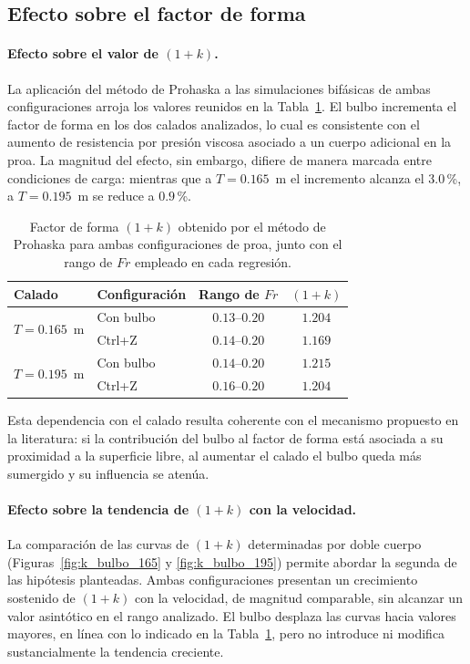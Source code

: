 \subsection{Efecto sobre el factor de forma}

\paragraph{Efecto sobre el valor de $(1+k)$.} La aplicación del método de 
Prohaska a las simulaciones bifásicas de ambas configuraciones arroja los 
valores reunidos en la Tabla~\ref{tab:k_bulbo_ctrlz}. El bulbo incrementa el 
factor de forma en los dos calados analizados, lo cual es consistente con el 
aumento de resistencia por presión viscosa asociado a un cuerpo adicional en 
la proa. La magnitud del efecto, sin embargo, difiere de manera marcada 
entre condiciones de carga: mientras que a $T = 0{.}165$~m el incremento 
alcanza el $3{.}0$\,\%, a $T = 0{.}195$~m se reduce a $0{.}9$\,\%.

\begin{table}[htpb]
\centering
\caption{Factor de forma $(1+k)$ obtenido por el método de Prohaska para 
ambas configuraciones de proa, junto con el rango de $Fr$ empleado en cada 
regresión.}
\label{tab:k_bulbo_ctrlz}
\begin{tabular}{llcc}
\hline
Calado & Configuración & Rango de $Fr$ & $(1+k)$ \\
\hline
\multirow{2}{*}{$T = 0{.}165$~m} & Con bulbo & $0{.}13$--$0{.}20$ & $1{.}204$ \\
                                 & Ctrl+Z    & $0{.}14$--$0{.}20$ & $1{.}169$ \\
\hline
\multirow{2}{*}{$T = 0{.}195$~m} & Con bulbo & $0{.}14$--$0{.}20$ & $1{.}215$ \\
                                 & Ctrl+Z    & $0{.}16$--$0{.}20$ & $1{.}204$ \\
\hline
\end{tabular}
\end{table}

Esta dependencia con el calado resulta coherente con el mecanismo propuesto 
en la literatura: si la contribución del bulbo al factor de forma está 
asociada a su proximidad a la superficie libre, al aumentar el calado el 
bulbo queda más sumergido y su influencia se atenúa.

\paragraph{Efecto sobre la tendencia de $(1+k)$ con la velocidad.} La 
comparación de las curvas de $(1+k)$ determinadas por doble cuerpo 
(Figuras~\ref{fig:k_bulbo_165} y \ref{fig:k_bulbo_195}) permite abordar la 
segunda de las hipótesis planteadas. Ambas configuraciones presentan un 
crecimiento sostenido de $(1+k)$ con la velocidad, de magnitud comparable, 
sin alcanzar un valor asintótico en el rango analizado. El bulbo desplaza 
las curvas hacia valores mayores, en línea con lo indicado en la 
Tabla~\ref{tab:k_bulbo_ctrlz}, pero no introduce ni modifica 
sustancialmente la tendencia creciente.

